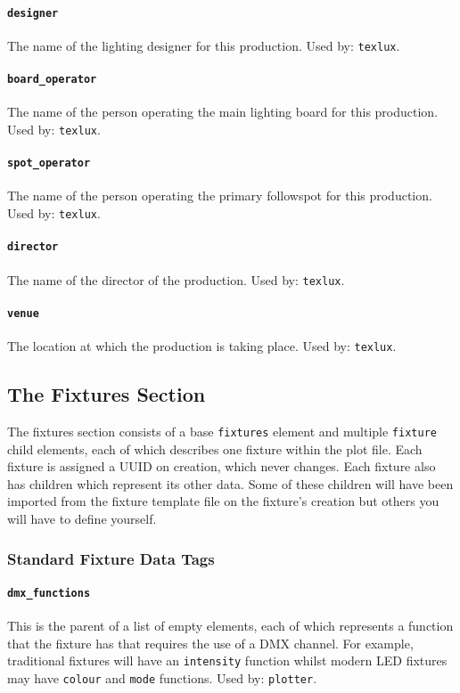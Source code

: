 \documentclass[a4paper]{article}
\begin{document}
\paragraph{\texttt{designer}}
The name of the lighting designer for this production. Used by: 
\texttt{texlux}.

\paragraph{\texttt{board\_operator}}
The name of the person operating the main lighting board for this production.
Used by: \texttt{texlux}.

\paragraph{\texttt{spot\_operator}}
The name of the person operating the primary followspot for this production.
Used by: \texttt{texlux}.

\paragraph{\texttt{director}}
The name of the director of the production. Used by: \texttt{texlux}.

\paragraph{\texttt{venue}}
The location at which the production is taking place. Used by: 
\texttt{texlux}.

\subsection{The Fixtures Section}
The fixtures section consists of a base \texttt{fixtures} element and 
multiple \texttt{fixture} child elements, each of which describes one fixture 
within the plot file. Each fixture is assigned a UUID on creation, which 
never changes. Each fixture also has children which represent its other data.
Some of these children will have been imported from the fixture template 
file on the fixture's creation but others you will have to define yourself.

\subsubsection{Standard Fixture Data Tags} \label{sec:fixtags}

\paragraph{\texttt{dmx\_functions}}
This is the parent of a list of empty elements, each of which represents a 
function that the fixture has that requires the use of a DMX channel. For 
example, traditional fixtures will have an \texttt{intensity} function 
whilst modern LED fixtures may have \texttt{colour} and \texttt{mode} 
functions. Used by: \texttt{plotter}.
\end{document}
